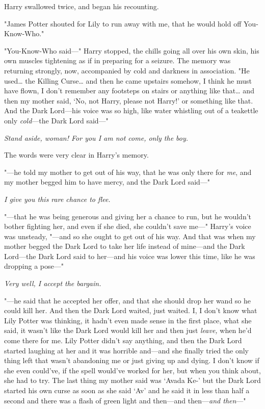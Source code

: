 Harry swallowed twice, and began his recounting.

"James Potter shouted for Lily to run away with me, that he would hold off 
You-Know-Who."

"You-Know-Who said---" Harry stopped, the chills going all over his own skin, 
his own muscles tightening as if in preparing for a seizure. The memory was 
returning strongly, now, accompanied by cold and darkness in association. "He 
used{\ldots} the Killing Curse{\ldots} and then he came upstairs somehow, I 
think he must have flown, I don't remember any footsteps on stairs or anything 
like that{\ldots} and then my mother said, `No, not Harry, please not Harry!' 
or something like that. And the Dark Lord---his voice was so high, like water 
whistling out of a teakettle only \emph{cold}---the Dark Lord said---"

\emph{Stand aside, woman! For you I am not come, only the boy.}

The words were very clear in Harry's memory.

"---he told my mother to get out of his way, that he was only there for 
\emph{me}, and my mother begged him to have mercy, and the Dark Lord said---"

\emph{I give you this rare chance to flee.}

"---that he was being generous and giving her a chance to run, but he wouldn't 
bother fighting her, and even if she died, she couldn't save me---" Harry's 
voice was unsteady, "---and so she ought to get out of his way. And that was 
when my mother begged the Dark Lord to take her life instead of mine---and the 
Dark Lord---the Dark Lord said to her---and his voice was lower this time, like 
he was dropping a pose---"

\emph{Very well, I accept the bargain.}

"---he said that he accepted her offer, and that she should drop her wand so he 
could kill her. And then the Dark Lord waited, just waited. I, I don't know 
what Lily Potter was thinking, it hadn't even made sense in the first place, 
what she said, it wasn't like the Dark Lord would kill her and then just 
\emph{leave,} when he'd come there for me. Lily Potter didn't say anything, and 
then the Dark Lord started laughing at her and it was horrible and---and she 
finally tried the only thing left that wasn't abandoning me or just giving up 
and dying. I don't know if she even could've, if the spell would've worked for 
her, but when you think about, she had to try. The last thing my mother said 
was `Avada Ke-' but the Dark Lord started his own curse as soon as she said 
`Av' and he said it in less than half a second and there was a flash of green 
light and then---and then---\emph{and then}---"

